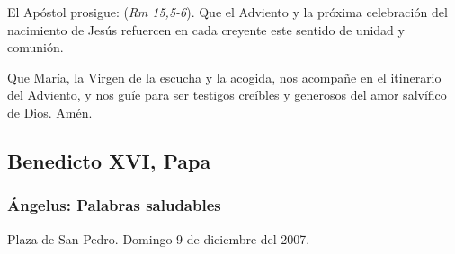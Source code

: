 \begin{body}
	El Apóstol prosigue:  (\emph{Rm 15,5-6}). Que el Adviento y la próxima celebración del nacimiento de Jesús refuercen en cada creyente este sentido de unidad y comunión.
	
	Que María, la Virgen de la escucha y la acogida, nos acompañe en el itinerario del Adviento, y nos guíe para ser testigos creíbles y generosos del amor salvífico de Dios. Amén.
\end{body}		

\subsection{Benedicto XVI, Papa}

\subsubsection{Ángelus: Palabras saludables}

Plaza de San Pedro. Domingo 9 de diciembre del 2007.

